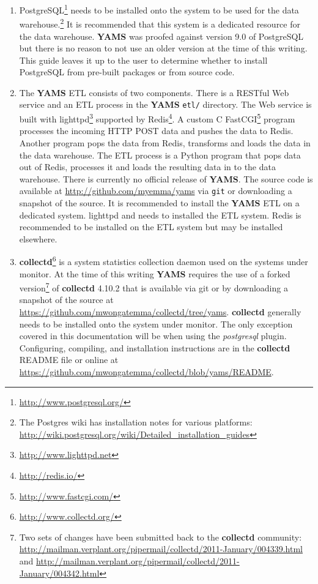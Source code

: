\documentclass[a4paper,twoside,12pt]{article}
\begin{document}
\begin{enumerate}
  \item PostgreSQL\footnote{\url{http://www.postgresql.org/}} needs to be
        installed onto the system to be used for the data
        warehouse.\footnote{The Postgres wiki has installation notes for
        various platforms:
        \url{http://wiki.postgresql.org/wiki/Detailed_installation_guides}} It
        is recommended that this system is a dedicated resource for the data
        warehouse.  \textbf{YAMS} was proofed against version 9.0 of PostgreSQL
        but there is no reason to not use an older version at the time of this
        writing.  This guide leaves it up to the user to determine whether to
        install PostgreSQL from pre-built packages or from source code.
  \item The \textbf{YAMS} ETL consists of two components.  There is a RESTful
        Web service and an ETL process in the \textbf{YAMS} \texttt{etl/}
        directory.  The Web service is built with
        lighttpd\footnote{\url{http://www.lighttpd.net}} supported by
        Redis\footnote{\url{http://redis.io/}}.  A custom C
        FastCGI\footnote{\url{http://www.fastcgi.com/}} program processes the
        incoming HTTP POST data and pushes the data to Redis.  Another program
        pops the data from Redis, transforms and loads the data in the data
        warehouse.  The ETL process is a Python program that pops data out of
        Redis, processes it and loads the resulting data in to the data
        warehouse.  There is currently no official release of \textbf{YAMS}.
        The source code is available at \url{http://github.com/myemma/yams} via
        \texttt{git} or downloading a snapshot of the source.  It is
        recommended to install the \textbf{YAMS} ETL on a dedicated system.
        lighttpd and needs to installed the ETL system.  Redis is recommended
        to be installed on the ETL system but may be installed elsewhere.
  \item \textbf{collectd}\footnote{\url{http://www.collectd.org/}} is a system
        statistics collection daemon used on the systems under monitor.  At the
        time of this writing \textbf{YAMS} requires the use of a forked
        version\footnote{Two sets of changes have been submitted back to the
        \textbf{collectd} community:
        \url{http://mailman.verplant.org/pipermail/collectd/2011-January/004339.html}
        and
        \url{http://mailman.verplant.org/pipermail/collectd/2011-January/004342.html}}
        of \textbf{collectd} 4.10.2 that is available via git or by downloading
        a snapshot of the source at
        \url{https://github.com/mwongatemma/collectd/tree/yams}.
        \textbf{collectd} generally needs to be installed onto the system under
        monitor.  The only exception covered in this documentation will be when
        using the \textit{postgresql} plugin.  Configuring, compiling, and
        installation instructions are in the \textbf{collectd} README file or
        online at
        \url{https://github.com/mwongatemma/collectd/blob/yams/README}.

\end{enumerate}
\end{document}
